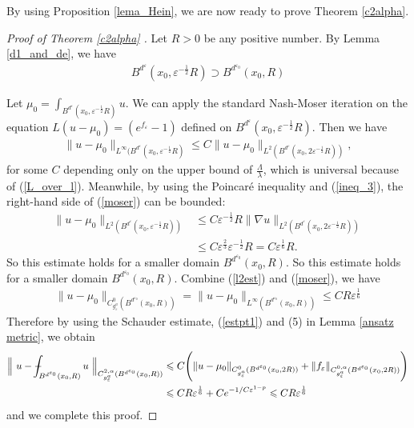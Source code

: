 \documentclass[11pt]{amsart}
\theoremstyle{plain}
\theoremstyle{definition}
\numberwithin{equation}{section}
\renewcommand{\leq}{\leqslant}
\def\Xint#1{\mathchoice
   {\XXint\displaystyle\textstyle{#1}}%
   {\XXint\textstyle\scriptstyle{#1}}%
   {\XXint\scriptstyle\scriptscriptstyle{#1}}%
   {\XXint\scriptscriptstyle\scriptscriptstyle{#1}}%
   \!\int}
\def\XXint#1#2#3{{\setbox0=\hbox{$#1{#2#3}{\int}$}
     \vcenter{\hbox{$#2#3$}}\kern-.5\wd0}}
\def\dashint{\Xint-}
\begin{document}
By using Proposition \ref{lema_Hein}, we are now ready to prove Theorem \ref{c2alpha}.
\begin{proof}[Proof of Theorem \ref{c2alpha} ]
Let $R>0$ be any positive number. By Lemma \ref{d1_and_de}, we have
\begin{align}
B^{d^{\varepsilon}}(x_0,\varepsilon^{-\frac{1}{2}} R)\supset B^{d^{\varepsilon_0}}(x_0, R)
\end{align}



Let $\mu_0=\int_{B^{d^{\varepsilon}}(x_0,\varepsilon^{-\frac{1}{2}} R)} u$. We can apply the standard Nash-Moser iteration on the equation $L(u-\mu_0)=(e^{f_{\varepsilon}}-1)$ defined on $B^{d^{\varepsilon}}(x_0,\varepsilon^{-\frac{1}{2}} R)$. Then we have
\begin{align}\label{moser}
\|u-\mu_0\|_{L^{\infty}(B^{d^{\varepsilon}}(x_0,\varepsilon^{-\frac{1}{2}} R)}\leq C \|u-\mu_0\|_{L^2(B^{d^{\varepsilon}}(x_0,2\varepsilon^{-\frac{1}{2}} R))},
\end{align}
for some $C$ depending only on the upper bound of $\frac{\Lambda}{\lambda}$, which is universal because of (\ref{L_over_l}). Meanwhile, by using the Poincar\'e inequality \cite[Lemma 2.1]{Hein} and (\ref{ineq_3}), the right-hand side of (\ref{moser}) can be bounded:
\begin{align}\label{l2est}
\|u-\mu_0\|_{L^2(B^{d^{\varepsilon}}(x_0,\varepsilon^{-\frac{1}{2}} R))}&\leq C\varepsilon^{-\frac{1}{2}} R\|\nabla u\|_{L^2(B^{d^{\varepsilon}}(x_0,2\varepsilon^{-\frac{1}{2}} R))}\\
&\leq C\varepsilon^{\frac{2}{3}}
 \varepsilon^{-\frac{1}{2}} R=C\varepsilon^{\frac{1}{6}}R.\nonumber
\end{align}
So this estimate holds for a smaller domain $B^{d^{\varepsilon_0}}(x_0, R)$. So this estimate holds for a smaller domain $B^{d^{\varepsilon_0}}(x_0, R)$. Combine (\ref{l2est}) and (\ref{moser}), we have
\begin{align}\label{estpt1}
\|u-\mu_0\|_{C^0_{g^a_{\varepsilon}}(B^{d^{\varepsilon_0}}(x_0, R))}=\|u-\mu_0\|_{L^{\infty}(B^{d^{\varepsilon_0}}(x_0, R))}\leq CR\varepsilon^{\frac{1}{6}}
\end{align}
Therefore by using the Schauder estimate, (\ref{estpt1}) and (5) in Lemma \ref{ansatz metric}, we obtain
\begin{align}
\Big\|\ u-\dashint_{B^{d^{\varepsilon_0}}(x_0, R)}u \ \Big\|_{C^{2,\alpha}_{g^a_{\varepsilon}}(B^{d^{\varepsilon_0}}(x_0, R))}&\leq C\Bigg(\|u-\mu_0\|_{C^0_{g^a_{\varepsilon}}(B^{d^{\varepsilon_0}}(x_0, 2R))}+\|f_{\varepsilon}\|_{C^{0,\alpha}_{g^a_{\varepsilon}}(B^{d^{\varepsilon_0}}(x_0, 2R))}\Bigg)\\
&\leq CR\varepsilon^{\frac{1}{6}}+Ce^{-1/C\varepsilon^{1-p}}\leq CR\varepsilon^{\frac{1}{6}}\nonumber
\end{align}
and we complete this proof.
\end{proof}
\end{document}
